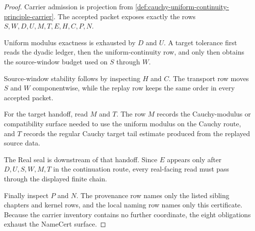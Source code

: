 \begin{proof}
Carrier admission is projection from \autoref{def:cauchy-uniform-continuity-principle-carrier}. The accepted packet exposes exactly the rows $S,W,D,U,M,T,E,H,C,P,N$.

Uniform modulus exactness is exhausted by $D$ and $U$. A target tolerance first reads the dyadic ledger, then the uniform-continuity row, and only then obtains the source-window budget used on $S$ through $W$.

Source-window stability follows by inspecting $H$ and $C$. The transport row moves $S$ and $W$ componentwise, while the replay row keeps the same order in every accepted packet.

For the target handoff, read $M$ and $T$. The row $M$ records the Cauchy-modulus or compatibility surface needed to use the uniform modulus on the Cauchy route, and $T$ records the regular Cauchy target tail estimate produced from the replayed source data.

The Real seal is downstream of that handoff. Since $E$ appears only after $D,U,S,W,M,T$ in the continuation route, every real-facing read must pass through the displayed finite chain.

Finally inspect $P$ and $N$. The provenance row names only the listed sibling chapters and kernel rows, and the local naming row names only this certificate. Because the carrier inventory contains no further coordinate, the eight obligations exhaust the NameCert surface.
\end{proof}

